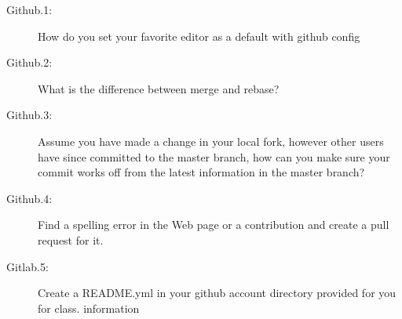 \begin{description}
\item[Github.1:] How do you set your favorite editor as a default with
  github config
\item[Github.2:] What is the difference between merge and rebase?
\item[Github.3:] Assume you have made a change in your local fork,
  however other users have since committed to the master branch, how
  can you make sure your commit works off from the latest information
  in the master branch?
\item[Github.4:] Find a spelling error in the Web page or a
  contribution and create a pull request for it.
\item[Gitlab.5:] Create a README.yml in your github account directory
  provided for you for class.  information

\end{description}
